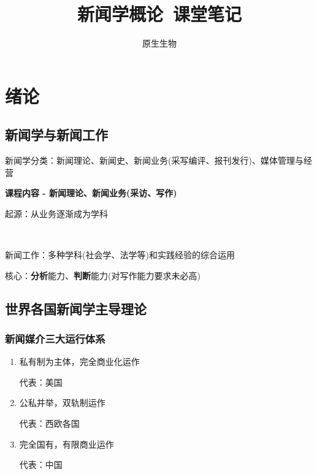 \documentclass[a4paper,UTF8]{ctexart}
\title{\heiti 新闻学概论\ 课堂笔记}
\author{原生生物}
\date{}
\begin{document}
\maketitle

\tableofcontents

\newpage
\section{绪论}
\subsection{新闻学与新闻工作}

新闻学分类：新闻理论、新闻史、新闻业务(采写编评、报刊发行)、媒体管理与经营

\textbf{课程内容 - 新闻理论、新闻业务(采访、写作)}

起源：从业务逐渐成为学科

~

新闻工作：多种学科(社会学、法学等)和实践经验的综合运用

核心：\textbf{分析}能力、\textbf{判断}能力(对写作能力要求未必高)

\subsection{世界各国新闻学主导理论}
\subsubsection{新闻媒介三大运行体系}
\begin{enumerate}
	\item 私有制为主体，完全商业化运作
	
	代表：美国
	
	\item 公私并举，双轨制运作
	
	代表：西欧各国
	
	\item  完全国有，有限商业运作
	
	代表：中国
\end{enumerate}
\end{document}
